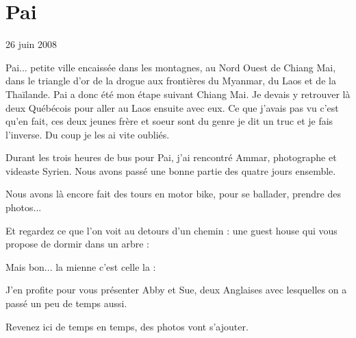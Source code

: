 \section{Pai}

26 juin 2008

\begin{multicols}{2}

Pai... petite ville encaissée dans les montagnes, au Nord Ouest de Chiang Mai, dans le triangle d'or de la drogue aux frontières du Myanmar, du Laos et de la Thaïlande. Pai a donc été mon étape suivant Chiang Mai. Je devais y retrouver là deux Québécois pour aller au Laos ensuite avec eux. Ce que j'avais pas vu c'est qu'en fait, ces deux jeunes frère et soeur sont du genre je dit un truc et je fais l'inverse. Du coup je les ai vite oubliés.

Durant les trois heures de bus pour Pai, j'ai rencontré Ammar, photographe et videaste Syrien. Nous avons passé une bonne partie des quatre jours ensemble.


Nous avons là encore fait des tours en motor bike, pour se ballader, prendre des photos...




Et regardez ce que l'on voit au detours d'un chemin : une guest house qui vous propose de dormir dans un arbre :


Mais bon... la mienne c'est celle la :


J'en profite pour vous présenter Abby et Sue, deux Anglaises avec lesquelles on a passé un peu de temps aussi.

Revenez ici de temps en temps, des photos vont s'ajouter.

\end{multicols}


